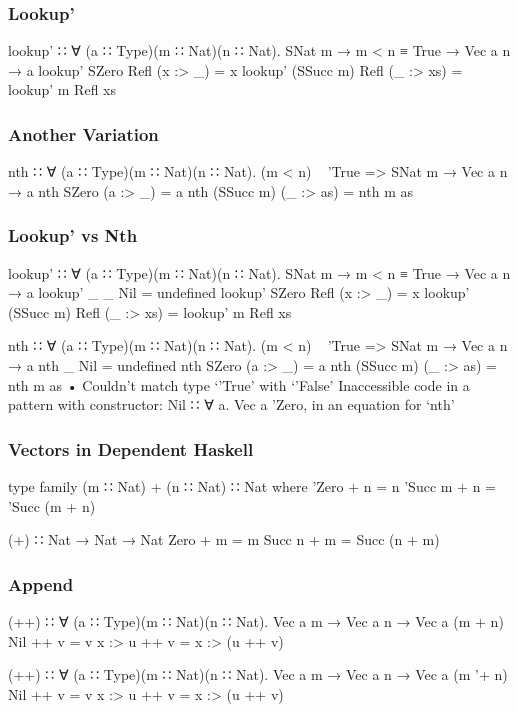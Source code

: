 \documentclass{beamer}
\begin{document}
\begin{frame}[fragile]\frametitle{Lookup'}
\begin{semiverbatim}
lookup' ∷ ∀ (a ∷ Type)(m ∷ Nat)(n ∷ Nat).
           SNat m → m < n ≡ True → Vec a n → a
lookup' SZero     Refl (x :> _)  = x
lookup' (SSucc m) Refl (_ :> xs) = lookup' m Refl xs
\end{semiverbatim}
\end{frame}

\begin{frame}[fragile]\frametitle{Another Variation}
\begin{semiverbatim}
nth ∷ ∀ (a ∷ Type)(m ∷ Nat)(n ∷ Nat).
      (m < n) ~ 'True => SNat m → Vec a n → a
nth SZero     (a :> _)  = a
nth (SSucc m) (_ :> as) = nth m as
\end{semiverbatim}
\end{frame}

\begin{frame}[fragile]\frametitle{Lookup' vs Nth}
\begin{semiverbatim}
lookup' ∷ ∀ (a ∷ Type)(m ∷ Nat)(n ∷ Nat).
           SNat m → m < n ≡ True → Vec a n → a
lookup' _         _    Nil       = undefined
lookup' SZero     Refl (x :> _)  = x
lookup' (SSucc m) Refl (_ :> xs) = lookup' m Refl xs

nth ∷ ∀ (a ∷ Type)(m ∷ Nat)(n ∷ Nat).
      (m < n) ~ 'True => SNat m → Vec a n → a
nth _         Nil       =  undefined
nth SZero     (a :> _)  = a
nth (SSucc m) (_ :> as) = nth m as
• Couldn't match type ‘'True’ with ‘'False’
  Inaccessible code in
    a pattern with constructor: Nil ∷ ∀ a. Vec a 'Zero,
    in an equation for ‘nth’
\end{semiverbatim}
\end{frame}

\begin{frame}[fragile]\frametitle{Vectors in Dependent Haskell}
\begin{semiverbatim}
type family (m ∷ Nat) + (n ∷ Nat) ∷ Nat where
  'Zero   + n = n
  'Succ m + n = 'Succ (m + n)

(+) ∷ Nat → Nat → Nat
Zero   + m = m
Succ n + m = Succ (n + m)
\end{semiverbatim}
\end{frame}

\begin{frame}[fragile]\frametitle{Append}
\begin{semiverbatim}
(++) ∷ ∀ (a ∷ Type)(m ∷ Nat)(n ∷ Nat).
       Vec a m → Vec a n → Vec a (m + n)
Nil    ++ v = v
x :> u ++ v = x :> (u ++ v)

(++) ∷ ∀ (a ∷ Type)(m ∷ Nat)(n ∷ Nat).
       Vec a m → Vec a n → Vec a (m '+ n)
Nil    ++ v = v
x :> u ++ v = x :> (u ++ v)
\end{semiverbatim}
\end{frame}
\end{document}
